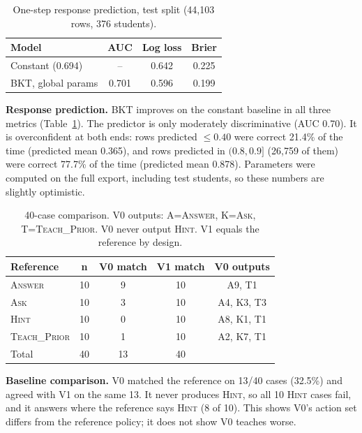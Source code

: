 \documentclass[10pt,twocolumn,letterpaper]{article}
\begin{document}
\begin{table}[t]\centering\small
\begin{tabular}{@{}lccc@{}}\toprule
Model & AUC & Log loss & Brier\\\midrule
Constant (0.694) & -- & 0.642 & 0.225\\
BKT, global params & 0.701 & 0.596 & 0.199\\\bottomrule
\end{tabular}
\caption{One-step response prediction, test split (44{,}103 rows, 376 students).}\label{tab:pred}
\end{table}

\textbf{Response prediction.} BKT improves on the constant baseline in all three metrics (Table~\ref{tab:pred}). The predictor is only moderately discriminative (AUC 0.70). It is overconfident at both ends: rows predicted $\le0.40$ were correct 21.4\% of the time (predicted mean 0.365), and rows predicted in $(0.8,0.9]$ (26{,}759 of them) were correct 77.7\% of the time (predicted mean 0.878). Parameters were computed on the full export, including test students, so these numbers are slightly optimistic.

\begin{table}[t]\centering\small
\begin{tabular}{@{}lcccc@{}}\toprule
Reference & n & V0 match & V1 match & V0 outputs\\\midrule
\textsc{Answer} & 10 & 9 & 10 & A9, T1\\
\textsc{Ask} & 10 & 3 & 10 & A4, K3, T3\\
\textsc{Hint} & 10 & 0 & 10 & A8, K1, T1\\
\textsc{Teach\_Prior} & 10 & 1 & 10 & A2, K7, T1\\\midrule
Total & 40 & 13 & 40 & \\\bottomrule
\end{tabular}
\caption{40-case comparison. V0 outputs: A=\textsc{Answer}, K=\textsc{Ask}, T=\textsc{Teach\_Prior}. V0 never output \textsc{Hint}. V1 equals the reference by design.}\label{tab:cmp}
\end{table}

\textbf{Baseline comparison.} V0 matched the reference on 13/40 cases (32.5\%) and agreed with V1 on the same 13. It never produces \textsc{Hint}, so all 10 \textsc{Hint} cases fail, and it answers where the reference says \textsc{Hint} (8 of 10). This shows V0's action set differs from the reference policy; it does not show V0 teaches worse.
\end{document}
